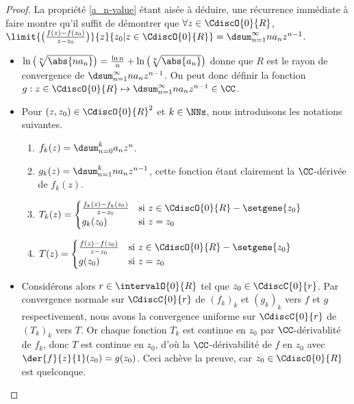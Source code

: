 \begin{proof}
	La propriété \ref{a_n-value} étant aisée à déduire, une récurrence immédiate à faire montre qu'il suffit de démontrer que
	$\forall z \in \CdiscO{0}{R}$,
	$ \limit{\big( \frac{f(z) - f(z_0)}{z - z_0} \big)}%
	        {z}{z_0 | z \in \CdiscO{0}{R}}
	= \dsum_{n = 1}^{\infty} n a_n z^{n - 1}$.
	\begin{itemize}
		\item
		$ \ln \big( \sqrt[n]{\abs{n a_n}} \big)
		= \frac{\ln n}{n} + \ln \big( \sqrt[n]{\abs{a_n}} \big)$
		donne que
		$R$ est le rayon de convergence de
		$\dsum_{n = 1}^{\infty} n a_n z^{n - 1}$.
		On peut donc définir la fonction $g: z \in \CdiscO{0}{R} \mapsto \dsum_{n = 1}^{\infty} n a_n z^{n - 1} \in \CC$.


		\item Pour $(z , z_0) \in \CdiscO{0}{R}^2$ et $k \in \NNs$, nous introduisons les notations suivantes.
        \begin{enumerate}[label=(\alph*)]
	        \item $f_k(z) = \dsum_{n = 0}^{k} a_n z^n$.

	        \item $g_k(z) = \dsum_{n = 1}^{k} n a_n z^{n-1}$,
	        cette fonction étant clairement la $\CC$-dérivée de $f_k(z)$.

	        \item $T_k(z) =
			\begin{cases}
	    		  \frac{f_k(z) - f_k(z_0)}{z - z_0}
				& \text{si $z \in \CdiscO{0}{R} - \setgene{z_0}$}
				\\
	   			  g_k(z_0) 
				& \text{si $z = z_0$}
	 		\end{cases}$

	        \item $T(z) =
			\begin{cases}
	    		  \frac{f(z) - f(z_0)}{z - z_0} 
				& \text{si $z \in \CdiscO{0}{R} - \setgene{z_0}$}
				\\
	   			  g(z_0)
				& \text{si $z = z_0$}
	 		\end{cases}$
	    \end{enumerate}


		\item Considérons alors $r \in \intervalO{0}{R}$ tel que $z_0 \in \CdiscC{0}{r}$.
		Par convergence normale sur $\CdiscC{0}{r}$ de $(f_k)_k$ et $(g_k)_k$ vers $f$ et $g$ respectivement,
		nous avons la convergence uniforme sur $\CdiscC{0}{r}$ de $(T_k)_k$ vers $T$. 
		Or chaque fonction $T_k$ est continue en $z_0$ par $\CC$-dérivablité de $f_k$, donc $T$ est continue en $z_0$,
		d'où
		la $\CC$-dérivabilité de  $f$ en $z_0$ avec $\der{f}{z}{1}(z_0) = g(z_0)$.
		Ceci achève la preuve, car $z_0 \in \CdiscO{0}{R}$ est quelconque.
	\end{itemize}

	\null\vspace{-6ex}
\end{proof}


